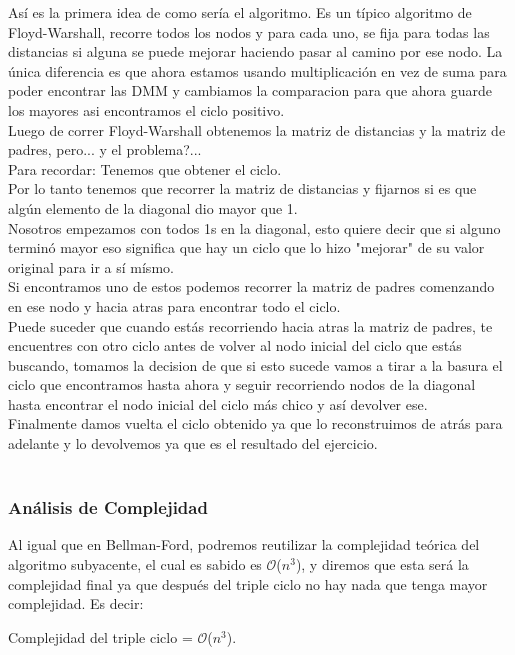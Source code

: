 \documentclass[11pt,a4paper]{article}
\begin{document}
Así es la primera idea de como sería el algoritmo. Es un típico algoritmo de Floyd-Warshall, recorre todos los nodos y para cada uno, se fija para todas las distancias si alguna se puede mejorar haciendo pasar al camino por ese nodo. La única diferencia es que ahora estamos usando multiplicación en vez de suma para poder encontrar las DMM y cambiamos la comparacion para que ahora guarde los mayores asi encontramos el ciclo positivo.\\
Luego de correr Floyd-Warshall obtenemos la matriz de distancias y la matriz de padres, pero... y el problema?...\\
Para recordar: Tenemos que obtener el ciclo.\\
Por lo tanto tenemos que recorrer la matriz de distancias y fijarnos si es que algún elemento de la diagonal dio mayor que 1.\\
Nosotros empezamos con todos 1s en la diagonal, esto quiere decir que si alguno terminó mayor eso significa que hay un ciclo que lo hizo "mejorar" de su valor original para ir a sí mísmo.\\
Si encontramos uno de estos podemos recorrer la matriz de padres comenzando en ese nodo y hacia atras para encontrar todo el ciclo.\\
Puede suceder que cuando estás recorriendo hacia atras la matriz de padres, te encuentres con otro ciclo antes de volver al nodo inicial del ciclo que estás buscando, tomamos la decision de que si esto sucede vamos a tirar a la basura el ciclo que encontramos hasta ahora y seguir recorriendo nodos de la diagonal hasta encontrar el nodo inicial del ciclo más chico y así devolver ese.\\
Finalmente damos vuelta el ciclo obtenido ya que lo reconstruimos de atrás para adelante y lo devolvemos ya que es el resultado del ejercicio.\\
\\

\subsubsection{An\'alisis de Complejidad}
Al igual que en Bellman-Ford, podremos reutilizar la complejidad te\'orica del algoritmo subyacente, el cual es sabido es $\mathcal{O}$($n^{3}$), y diremos que esta ser\'a la complejidad final ya que despu\'es del triple ciclo no hay nada que tenga mayor complejidad. Es decir:

Complejidad del triple ciclo = $\mathcal{O}$($n^{3}$).
\end{document}
